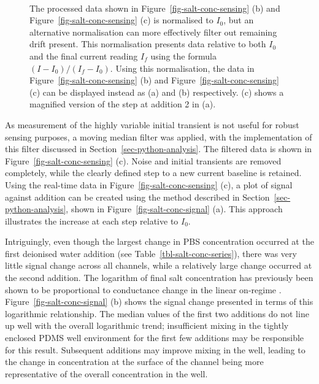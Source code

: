 \documentclass[
  a4paper,
]{scrbook}
\begin{document}
\begin{figure}
\begin{minipage}[t]{0.70\linewidth}
{{}

}

\end{minipage}%
%
\begin{minipage}[t]{0.15\linewidth}

{\centering 

~

}

\end{minipage}%

\caption{\label{fig-salt-conc-sensing-2}The processed data shown in
Figure~\ref{fig-salt-conc-sensing} (b) and
Figure~\ref{fig-salt-conc-sensing} (c) is normalised to \(I_{0}\), but
an alternative normalisation can more effectively filter out remaining
drift present. This normalisation presents data relative to both
\(I_{0}\) and the final current reading \(I_{f}\) using the formula
\((I - I_0)/(I_f - I_0)\). Using this normalisation, the data in
Figure~\ref{fig-salt-conc-sensing} (b) and
Figure~\ref{fig-salt-conc-sensing} (c) can be displayed instead as (a)
and (b) respectively. (c) shows a magnified version of the step at
addition 2 in (a).}

\end{figure}

As measurement of the highly variable initial transient is not useful
for robust sensing purposes, a moving median filter was applied, with
the implementation of this filter discussed in
Section~\ref{sec-python-analysis}. The filtered data is shown in
Figure~\ref{fig-salt-conc-sensing} (c). Noise and initial transients are
removed completely, while the clearly defined step to a new current
baseline is retained. Using the real-time data in
Figure~\ref{fig-salt-conc-sensing} (c), a plot of signal against
addition can be created using the method described in
Section~\ref{sec-python-analysis}, shown in
Figure~\ref{fig-salt-conc-signal} (a). This approach illustrates the
increase at each step relative to \(I_{0}\).

Intriguingly, even though the largest change in PBS concentration
occurred at the first deionised water addition (see
Table~\ref{tbl-salt-conc-series}), there was very little signal change
across all channels, while a relatively large change occurred at the
second addition. The logarithm of final salt concentration has
previously been shown to be proportional to conductance change in the
linear on-regime \autocite{Heller2010}.
Figure~\ref{fig-salt-conc-signal} (b) shows the signal change presented
in terms of this logarithmic relationship. The median values of the
first two additions do not line up well with the overall logarithmic
trend; insufficient mixing in the tightly enclosed PDMS well environment
for the first few additions may be responsible for this result.
Subsequent additions may improve mixing in the well, leading to the
change in concentration at the surface of the channel being more
representative of the overall concentration in the well.
\end{document}
